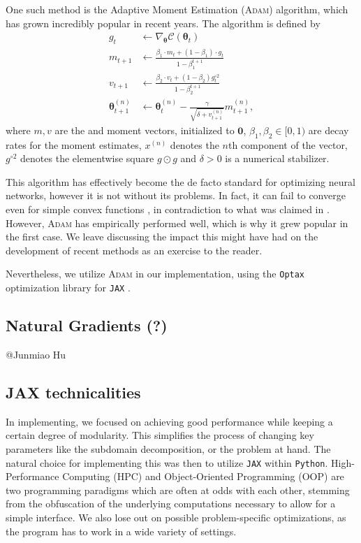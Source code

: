 One such method is the Adaptive Moment Estimation (\textsc{Adam}) \cite{kingma2017adam} algorithm, which has grown incredibly popular in recent years. The algorithm is defined by
\begin{equation}
\begin{split}
    g_{t} &\gets \nabla_{\boldsymbol{\theta}}\mathcal{C}(\boldsymbol{\theta}_t) \\
    m_{t+1} &\gets \frac{\beta_1 \cdot m_t + (1-\beta_1) \cdot g_t}{1 - \beta_1^{t+1}} \\
    v_{t+1} &\gets \frac{\beta_2 \cdot v_t + (1 - \beta_2)g_t^{\circ 2}}{1 - \beta_2^{t+1}} \\
    \boldsymbol{\theta}_{t+1}^{(n)} &\gets \boldsymbol{\theta}_t^{(n)} - \frac{\gamma}{\sqrt{\delta + v_{t+1}^{(n)}}} m_{t+1}^{(n)},
\end{split}
\end{equation}
where $m, v$ are the  and  moment vectors, initialized to $\boldsymbol{0}$, $\beta_1, \beta_2 \in [0,1)$ are decay rates for the moment estimates, $x^{(n)}$ denotes the $n$th component of the vector, $g^{\circ 2}$ denotes the elementwise square $g \odot g$ and $\delta > 0$ is a numerical stabilizer. 

This algorithm has effectively become the de facto standard for optimizing neural networks, however it is not without its problems. In fact, it can fail to converge even for simple convex functions \cite{reddi2019convergence}, in contradiction to what was claimed in \cite{kingma2017adam}. However, \textsc{Adam} has empirically performed well, which is why it grew popular in the first case. We leave discussing the impact this might have had on the development of recent methods as an exercise to the reader.

Nevertheless, we utilize \textsc{Adam} in our implementation, using the \verb|Optax| \cite{deepmind2020jax} optimization library for \verb|JAX| \cite{jax2018github}.

\subsection{Natural Gradients (?)}
@Junmiao Hu

\subsection{JAX technicalities}\label{sec:JAX}
In implementing, we focused on achieving good performance while keeping a certain degree of modularity. This simplifies the process of changing key parameters like the subdomain decomposition, or the problem at hand. The natural choice for implementing this was then to utilize \verb|JAX| \cite{jax2018github} within \verb|Python|. High-Performance Computing (HPC) and Object-Oriented Programming (OOP) are two programming paradigms which are often at odds with each other, stemming from the obfuscation of the underlying computations necessary to allow for a simple interface. We also lose out on possible problem-specific optimizations, as the program has to work in a wide variety of settings.

